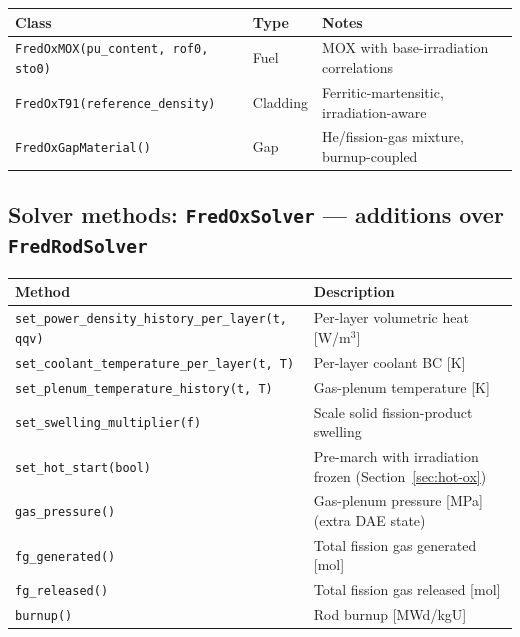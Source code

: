 \documentclass[11pt,a4paper]{article}
\begin{document}
\begin{center}
\begin{tabular}{lll}
\toprule
Class & Type & Notes \\
\midrule
\texttt{FredOxMOX(pu\_content, rof0, sto0)} & Fuel     & MOX with base-irradiation correlations \\
\texttt{FredOxT91(reference\_density)}      & Cladding & Ferritic-martensitic, irradiation-aware \\
\texttt{FredOxGapMaterial()}                & Gap      & He/fission-gas mixture, burnup-coupled \\
\bottomrule
\end{tabular}
\end{center}

\subsection{Solver methods: \texttt{FredOxSolver} --- additions over \texttt{FredRodSolver}}

\begin{center}
\begin{tabular}{ll}
\toprule
Method & Description \\
\midrule
\texttt{set\_power\_density\_history\_per\_layer(t, qqv)} & Per-layer volumetric heat [W/m$^3$] \\
\texttt{set\_coolant\_temperature\_per\_layer(t, T)}       & Per-layer coolant BC [K] \\
\texttt{set\_plenum\_temperature\_history(t, T)}           & Gas-plenum temperature [K] \\
\texttt{set\_swelling\_multiplier(f)}                      & Scale solid fission-product swelling \\
\texttt{set\_hot\_start(bool)}                              & Pre-march with irradiation frozen (Section~\ref{sec:hot-ox}) \\
\midrule
\texttt{gas\_pressure()}              & Gas-plenum pressure [MPa] (extra DAE state) \\
\texttt{fg\_generated()}              & Total fission gas generated [mol] \\
\texttt{fg\_released()}               & Total fission gas released [mol] \\
\texttt{burnup()}                     & Rod burnup [MWd/kgU] \\
\bottomrule
\end{tabular}
\end{center}
\end{document}

